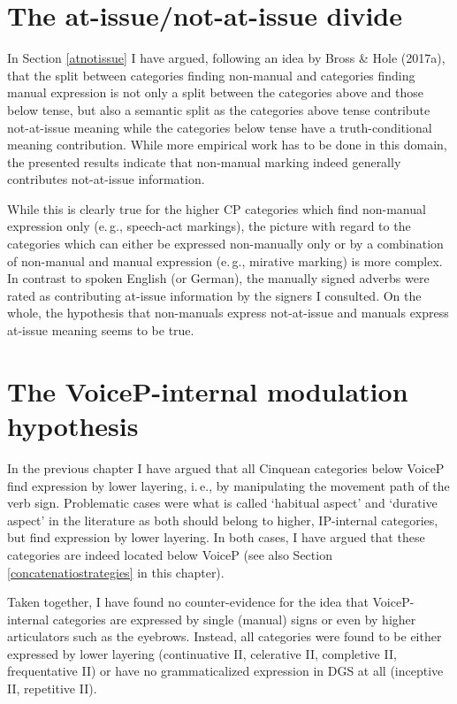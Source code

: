 \section{The at-issue/not-at-issue divide}
In Section \ref{atnotissue} I have argued, following an idea by Bross \& Hole (2017a), that the split between categories finding non-manual and categories finding manual expression is not only a split between the categories above and those below tense, but also a semantic split as the categories above tense contribute not-at-issue meaning while the categories below tense have a truth-conditional meaning contribution. While more empirical work has to be done in this domain, the presented results indicate that non-manual marking indeed generally contributes not-at-issue information. 

While this is clearly true for the higher CP categories which find non-manual expression only (e.\,g., speech-act markings), the picture with regard to the categories which can either be expressed non-manually only or by a combination of non-manual and manual expression (e.\,g., mirative marking) is more complex. In contrast to spoken English (or German), the manually signed adverbs were rated as contributing at-issue information by the signers I consulted. On the whole, the hypothesis that non-manuals express not-at-issue and manuals express at-issue meaning seems to be true. %





\section{The VoiceP-internal modulation hypothesis}
In the previous chapter I have argued that all Cinquean categories below VoiceP find expression by lower layering, i.\,e., by manipulating the movement path of the verb sign. Problematic cases were what is called `habitual aspect' and `durative aspect' in the literature as both should belong to higher, IP-internal categories, but find expression by lower layering. In both cases, I have argued that these categories are indeed located below VoiceP (see also Section \ref{concatenatiostrategies} in this chapter). 


Taken together, I have found no counter-evidence for the idea that VoiceP-internal categories are expressed by single (manual) signs or even by higher articulators such as the eyebrows. Instead, all categories were found to be either expressed by lower layering (continuative II, celerative II, completive II, frequentative II) or have no grammaticalized expression in DGS at all (inceptive II, repetitive II). 


